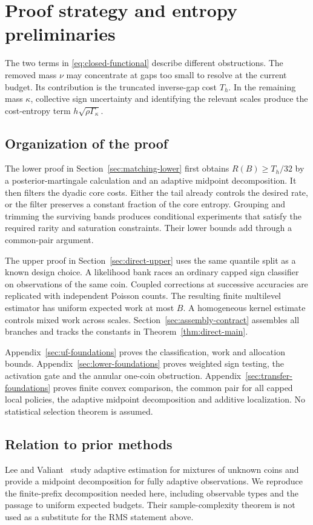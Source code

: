 \section{Proof strategy and entropy preliminaries}\label{sec:overview}
The two terms in \eqref{eq:closed-functional} describe different
obstructions. The removed mass $\nu$ may concentrate at gaps too
small to resolve at the current budget. Its contribution is the
truncated inverse-gap cost $T_h$. In the remaining mass $\kappa$,
collective sign uncertainty and identifying the relevant scales
produce the cost-entropy term $h\sqrt{\rho\Gamma_\kappa}$.

\subsection{Organization of the proof}
The lower proof in Section~\ref{sec:matching-lower} first obtains
$R(B)\ge T_h/32$ by a posterior-martingale calculation and an
adaptive midpoint decomposition. It then filters the dyadic core
costs. Either the tail already controls the desired rate, or the
filter preserves a constant fraction of the core entropy. Grouping
and trimming the surviving bands produces conditional experiments
that satisfy the required rarity and saturation constraints.
Their lower bounds add through a common-pair argument.

The upper proof in Section~\ref{sec:direct-upper} uses the same
quantile split as a known design choice. A likelihood bank races
an ordinary capped sign classifier on observations of the same
coin. Coupled corrections at successive accuracies are replicated
with independent Poisson counts. The resulting finite multilevel
estimator has uniform expected work at most $B$. A homogeneous
kernel estimate controls mixed work across scales.
Section~\ref{sec:assembly-contract} assembles all branches and
tracks the constants in Theorem~\ref{thm:direct-main}.

Appendix~\ref{sec:uf-foundations} proves the classification, work
and allocation bounds. Appendix~\ref{sec:lower-foundations}
proves weighted sign testing, the activation gate and the annular
one-coin obstruction. Appendix~\ref{sec:transfer-foundations}
proves finite convex comparison, the common pair for all capped
local policies, the adaptive midpoint decomposition and additive
localization. No statistical selection theorem is assumed.

\subsection{Relation to prior methods}
Lee and Valiant~\cite{lv} study adaptive estimation for mixtures
of unknown coins and provide a midpoint decomposition for
fully adaptive observations. We reproduce the finite-prefix
decomposition needed here, including observable types and the
passage to uniform expected budgets. Their sample-complexity
theorem is not used as a substitute for the RMS statement above.

